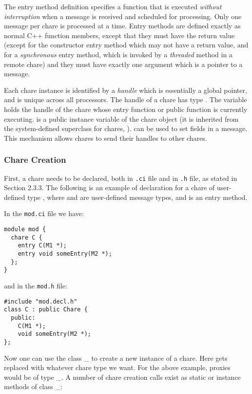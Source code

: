 The entry method definition specifies a function that is executed {\it
without interruption} when a message is received and scheduled for
processing. Only one message per chare is processed at a time.  Entry
methods are defined exactly as normal C++ function members, except
that they must have the return value  (except for the
constructor entry method which may not have a return value, and for a {\em synchronous}
entry method, which is invoked by a {\em threaded} method in a remote chare) and they
must have exactly one argument which is a pointer to a
message.

Each chare instance is identified by a {\it handle} 
which is essentially a global pointer, and is unique across all
processors.  The handle of a chare has type 
.  The
variable   holds the handle of the
chare whose entry function or public function is currently executing.
 is a public instance variable of the chare object
(it is inherited from the system-defined superclass for chares, ).
 can be used to set fields in a message. This  
mechanism allows chares to send their handles to other chares.

\subsubsection{Chare Creation}
\label{chare creation}

First, a chare needs to be declared, both in {\tt .ci} file and in
{\tt .h} file, as stated in Section 2.3.3. The following is an example of
declaration for a chare of user-defined type , where 
and  are user-defined message types, and 
is an entry method.

In the {\tt mod.ci} file we have:

\begin{verbatim}
module mod {
  chare C {
    entry C(M1 *);
    entry void someEntry(M2 *);
  };
}
\end{verbatim}

and in the {\tt mod.h} file:

\begin{verbatim}
#include "mod.decl.h"
class C : public Chare {
  public:
    C(M1 *);
    void someEntry(M2 *);
};
\end{verbatim}

Now one can use the class \_ to create
a new instance of a chare.  Here  gets replaced with
whatever chare type we want.  For the above example, proxies would
be of type \_. A number of chare creation calls
exist as static or instance methods of class \_:

